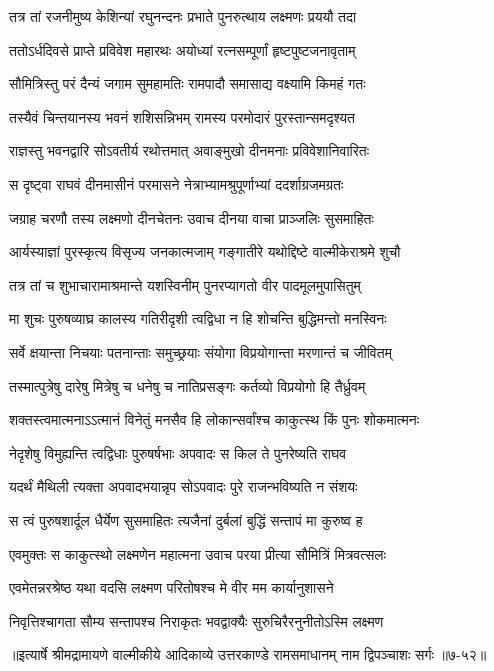 
\twolineshloka
{तत्र तां रजनीमुष्य केशिन्यां रघुनन्दनः}
{प्रभाते पुनरुत्थाय लक्ष्मणः प्रययौ तदा} %

\twolineshloka
{ततोऽर्धदिवसे प्राप्ते प्रविवेश महारथः}
{अयोध्यां रत्नसम्पूर्णां हृष्टपुष्टजनावृताम्} %

\twolineshloka
{सौमित्रिस्तु परं दैन्यं जगाम सुमहामतिः}
{रामपादौ समासाद्य वक्ष्यामि किमहं गतः} %

\twolineshloka
{तस्यैवं चिन्तयानस्य भवनं शशिसन्निभम्}
{रामस्य परमोदारं पुरस्तान्समदृश्यत} %

\twolineshloka
{राज्ञस्तु भवनद्वारि सोऽवतीर्य रथोत्तमात्}
{अवाङ्मुखो दीनमनाः प्रविवेशानिवारितः} %

\twolineshloka
{स दृष्ट्वा राघवं दीनमासीनं परमासने}
{नेत्राभ्यामश्रुपूर्णाभ्यां ददर्शाग्रजमग्रतः} %

\twolineshloka
{जग्राह चरणौ तस्य लक्ष्मणो दीनचेतनः}
{उवाच दीनया वाचा प्राञ्जलिः सुसमाहितः} %

\twolineshloka
{आर्यस्याज्ञां पुरस्कृत्य विसृज्य जनकात्मजाम्}
{गङ्गातीरे यथोद्दिष्टे वाल्मीकेराश्रमे शुचौ} %

\twolineshloka
{तत्र तां च शुभाचारामाश्रमान्ते यशस्विनीम्}
{पुनरप्यागतो वीर पादमूलमुपासितुम्} %

\twolineshloka
{मा शुचः पुरुषव्याघ्र कालस्य गतिरीदृशी}
{त्वद्विधा न हि शोचन्ति बुद्धिमन्तो मनस्विनः} %

\twolineshloka
{सर्वे क्षयान्ता निचयाः पतनान्ताः समुच्छ्रयाः}
{संयोगा विप्रयोगान्ता मरणान्तं च जीवितम्} %

\twolineshloka
{तस्मात्पुत्रेषु दारेषु मित्रेषु च धनेषु च}
{नातिप्रसङ्गः कर्तव्यो विप्रयोगो हि तैर्ध्रुवम्} %

\twolineshloka
{शक्तस्त्वमात्मनाऽऽत्मानं विनेतुं मनसैव हि}
{लोकान्सर्वांश्च काकुत्स्थ किं पुनः शोकमात्मनः} %

\twolineshloka
{नेदृशेषु विमुह्यन्ति त्वद्विधाः पुरुषर्षभाः}
{अपवादः स किल ते पुनरेष्यति राघव} %

\twolineshloka
{यदर्थं मैथिली त्यक्ता अपवादभयान्नृप}
{सोऽपवादः पुरे राजन्भविष्यति न संशयः} %

\twolineshloka
{स त्वं पुरुषशार्दूल धैर्येण सुसमाहितः}
{त्यजैनां दुर्बलां बुद्धिं सन्तापं मा कुरुष्व ह} %

\twolineshloka
{एवमुक्तः स काकुत्स्थो लक्ष्मणेन महात्मना}
{उवाच परया प्रीत्या सौमित्रिं मित्रवत्सलः} %

\twolineshloka
{एवमेतन्नरश्रेष्ठ यथा वदसि लक्ष्मण}
{परितोषश्च मे वीर मम कार्यानुशासने} %

\twolineshloka
{निवृत्तिश्चागता सौम्य सन्तापश्च निराकृतः}
{भवद्वाक्यैः सुरुचिरैरनुनीतोऽस्मि लक्ष्मण} %


॥इत्यार्षे श्रीमद्रामायणे वाल्मीकीये आदिकाव्ये उत्तरकाण्डे रामसमाधानम् नाम द्विपञ्चाशः सर्गः ॥७-५२॥
